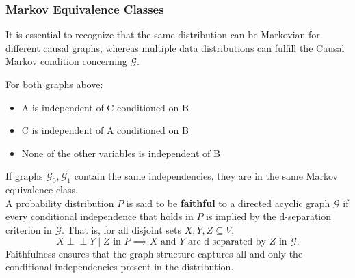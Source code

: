 \documentclass{article}
\newcommand{\indep}{\perp\!\!\!\!\perp}
\begin{document}
	\subsubsection*{Markov Equivalence Classes}
	
	It is essential to recognize that the same distribution can be Markovian for different causal graphs, whereas multiple data distributions can fulfill the Causal Markov condition concerning $\mathcal{G}$. 
	
	\begin{center}
	\end{center}
	
	For both graphs above:
	\begin{itemize}
		\item A is independent of C conditioned on B
		\item C is independent of A conditioned on B
		\item None of the other variables is independent of B
	\end{itemize}
	
	If graphs $\mathcal{G}_0, \mathcal{G}_1$ contain the same independencies, they are in the same Markov equivalence class. \\
	
	A probability distribution $P$ is said to be \textbf{faithful} to a directed acyclic graph $\mathcal{G}$ if every conditional independence that holds in $P$ is implied by the d-separation criterion in $\mathcal{G}$. That is, for all disjoint sets $X, Y, Z \subseteq V$,
	$$X \indep Y \mid Z \text{ in } P \implies X \text{ and } Y \text{ are d-separated by } Z \text{ in } \mathcal{G}.$$
	Faithfulness ensures that the graph structure captures all and only the conditional independencies present in the distribution. \\
	
\end{document}
